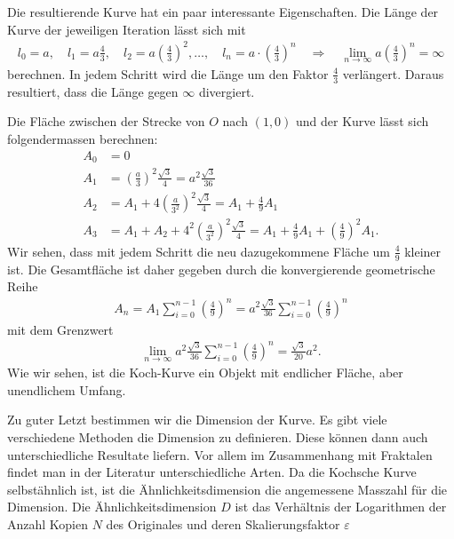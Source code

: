 Die resultierende Kurve hat ein paar interessante Eigenschaften.
Die Länge der Kurve der jeweiligen Iteration lässt sich mit 
\begin{align*}
	l_0 = a ,\quad l_1 = a  \frac{4}{3} ,\quad l_2 = a  \left( \frac{4}{3}\right)^2 , \dots , \quad
	l_n = a \cdot \left( \frac{4}{3}\right)^n \quad
	\Rightarrow \quad
	\lim_{n\to\infty} a  \left( \frac{4}{3}\right)^n = \infty
\end{align*}
berechnen.
In jedem Schritt wird die Länge um den Faktor $\frac{4}{3}$ verlängert. Daraus resultiert, dass die Länge gegen $\infty$ divergiert. 
%


Die Fläche zwischen der Strecke von $O$ nach $(1,0)$ und der Kurve lässt sich folgendermassen berechnen:
\begin{align*}
	A_0 &= 0 \\
	A_1 &= \left( \frac{a}{3}\right)^2 \frac{\sqrt{3}}{4} = a^2 \frac{\sqrt{3}}{36}\\
	A_2 &= A_1 + 4\left( \frac{a}{3^2}\right)^2 \frac{\sqrt{3}}{4} = A_1 + \frac{4}{9} A_1 \\ 
	A_3 &= A_1 + A_2 + 4^2 \left( \frac{a}{3^2}\right)^2 \frac{\sqrt{3}}{4} = A_1 + \frac{4}{9} A_1 + \left( \frac{4}{9}\right)^2 A_1.
\end{align*}
Wir sehen, dass mit jedem Schritt die neu dazugekommene Fläche um $\frac{4}{9}$ kleiner ist.
Die Gesamtfläche ist daher gegeben durch die konvergierende geometrische Reihe
\begin{align*}
	A_n = A_1 \sum_{i = 0}^{n-1} \left( \frac{4}{9}\right)^n =  a^2 \frac{\sqrt{3}}{36} \sum_{i = 0}^{n-1} \left( \frac{4}{9}\right)^n
\end{align*}
mit dem Grenzwert
\begin{align*}
	\lim_{n\to\infty} a^2 \frac{\sqrt{3}}{36} \sum_{i = 0}^{n-1} \left( \frac{4}{9}\right)^n = \frac{\sqrt{3}}{20} a^2. 
\end{align*}
Wie wir sehen, ist die Koch-Kurve ein Objekt mit endlicher Fläche, aber unendlichem Umfang.


Zu guter Letzt bestimmen wir die Dimension der Kurve. 
Es gibt viele verschiedene Methoden die Dimension zu definieren. Diese können dann auch unterschiedliche Resultate liefern.
Vor allem im Zusammenhang mit Fraktalen findet man in der Literatur unterschiedliche Arten.
Da die Kochsche Kurve selbstähnlich ist, ist die Ähnlichkeitsdimension \cite{ifs:fractal-geometry} die angemessene Masszahl für die Dimension.
Die Ähnlichkeitsdimension $D$ ist das Verhältnis der Logarithmen der Anzahl Kopien $N$ des Originales und deren Skalierungsfaktor $\varepsilon$
  
